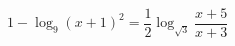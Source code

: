 \begin{ex}[type=equation]
	\begin{condition}
		$1 - \log_9 (x + 1)^2 = \dfrac{1}{2}\log_{\sqrt{3}} \dfrac{x + 5}{x + 3}$
	\end{condition}
\end{ex}